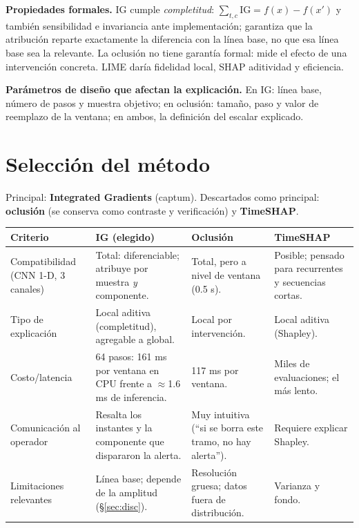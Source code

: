 \documentclass[10pt,letterpaper]{article}
\newcommand{\vCostIG}{161 ms}\newcommand{\vCostOcc}{117 ms}
\begin{document}
\textbf{Propiedades formales.} IG cumple \emph{completitud}: $\sum_{t,c}\mathrm{IG}=f(x)-f(x')$ y también sensibilidad e
invariancia ante implementación; garantiza que la atribución reparte exactamente la diferencia con la línea base, no
que esa línea base sea la relevante. La oclusión no tiene garantía formal: mide el efecto de una intervención concreta. LIME
daría fidelidad local, SHAP aditividad y eficiencia.

\textbf{Parámetros de diseño que afectan la explicación.} En IG: línea base, número de pasos y muestra objetivo; en
oclusión: tamaño, paso y valor de reemplazo de la ventana; en ambos, la definición del escalar explicado.

\section{Selección del método}
Principal: \textbf{Integrated Gradients} (captum). Descartados como principal: \textbf{oclusión} (se conserva como contraste y verificación) y \textbf{TimeSHAP}.
\begin{table}[h]\centering\footnotesize
\begin{tabularx}{\textwidth}{>{\raggedright\arraybackslash}p{3.1cm}XXX}
\toprule
Criterio & IG (elegido) & Oclusión & TimeSHAP\\\midrule
Compatibilidad (CNN 1-D, 3 canales) & Total: diferenciable; atribuye por muestra \emph{y} componente. & Total, pero a nivel de ventana (0.5 s). & Posible; pensado para recurrentes y secuencias cortas.\\
Tipo de explicación & Local aditiva (completitud), agregable a global. & Local por intervención. & Local aditiva (Shapley).\\
Costo/latencia & 64 pasos: \vCostIG{} por ventana en CPU frente a $\approx$1.6 ms de inferencia. & \vCostOcc{} por ventana. & Miles de evaluaciones; el más lento.\\
Comunicación al operador & Resalta los instantes y la componente que dispararon la alerta. & Muy intuitiva (``si se borra este tramo, no hay alerta''). & Requiere explicar Shapley.\\
Limitaciones relevantes & Línea base; depende de la amplitud (\S\ref{sec:disc}). & Resolución gruesa; datos fuera de distribución. & Varianza y fondo.\\
\bottomrule
\end{tabularx}
\end{table}
\end{document}
